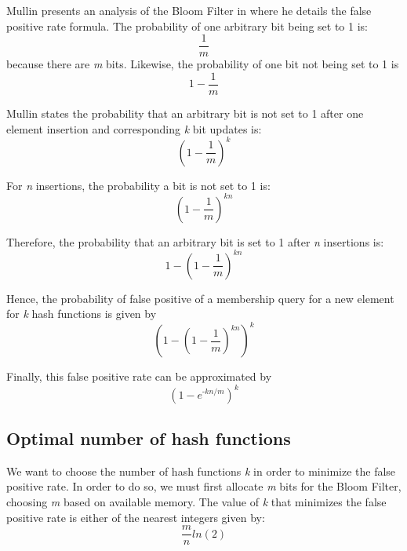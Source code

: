 Mullin presents an analysis of the Bloom Filter in \cite{Mullin-Bloom-Analysis} where he details the false positive rate formula. The probability of one arbitrary bit being set to 1 is:
\begin{equation}
    \frac{1}{m}
\end{equation}
because there are \textit{m} bits. Likewise, the probability of one bit not being set to 1 is
\begin{equation}
    1-\frac{1}{m}
\end{equation}

Mullin states the probability that an arbitrary bit is not set to 1 after one element insertion and corresponding \textit{k} bit updates is:
\begin{equation}
    (1-\frac{1}{m})^\textit{k}
\end{equation}

For \textit{n} insertions, the probability a bit is not set to 1 is:
\begin{equation}
    (1-\frac{1}{m})^\textit{kn}
\end{equation}

Therefore, the probability that an arbitrary bit is set to 1 after \textit{n} insertions is:
\begin{equation}
    1-(1-\frac{1}{m})^\textit{kn}
\end{equation}

Hence, the probability of false positive of a membership query for a new element for \textit{k} hash functions is given by
\begin{equation}
    (1-(1-\frac{1}{m})^\textit{kn})^\textit{k}
\end{equation}

Finally, this false positive rate can be approximated by 
\begin{equation}
    (1-e^\textit{-kn/m})^\textit{k}
\end{equation}


\subsection*{Optimal number of hash functions}
We want to choose the number of hash functions \textit{k} in order to minimize the false positive rate. In order to do so, we must first allocate \textit{m} bits for the Bloom Filter, choosing \textit{m} based on available memory. The value of \textit{k} that minimizes the false positive rate is either of the nearest integers given by:
\begin{equation}
    \frac{m}{n}ln(2)
\end{equation}

